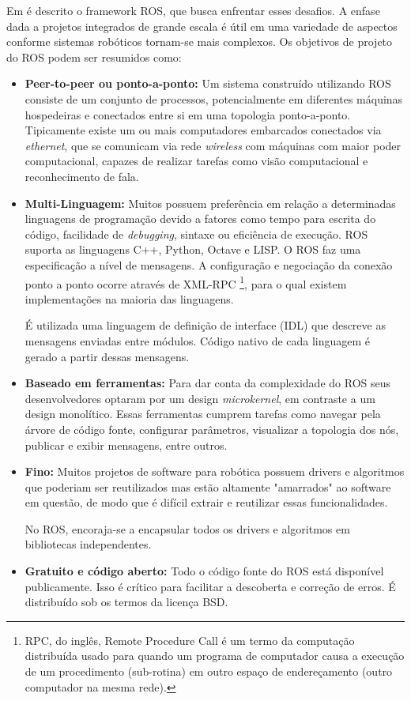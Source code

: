 Em \citep{quigley2009ros} é descrito o framework ROS, que busca enfrentar esses desafios. A enfase dada a projetos integrados de grande escala é útil em uma variedade de aspectos conforme sistemas robóticos tornam-se mais complexos. Os objetivos de projeto do ROS podem ser resumidos como: 
\begin{itemize}
\item \textbf{Peer-to-peer ou ponto-a-ponto:} Um sistema construído utilizando ROS consiste de um conjunto de processos, potencialmente em diferentes máquinas hospedeiras e conectados entre si em uma topologia ponto-a-ponto. Tipicamente existe um ou mais computadores embarcados conectados via \textit{ethernet}, que se comunicam via rede \textit{wireless} com máquinas com maior poder computacional, capazes de realizar tarefas como visão computacional e reconhecimento de fala. 

\item \textbf{Multi-Linguagem:} Muitos possuem preferência em relação a determinadas linguagens de programação devido a fatores como tempo para escrita do código, facilidade de \textit{debugging}, sintaxe ou eficiência de execução. ROS suporta as linguagens C++, Python, Octave e LISP. O ROS faz uma especificação a nível de mensagens. A configuração e negociação da conexão ponto a ponto ocorre através de XML-RPC \footnote{RPC, do inglês, Remote Procedure Call é um termo da computação distribuída usado para quando um programa de computador causa a execução de um procedimento (sub-rotina) em outro espaço de endereçamento (outro computador na mesma rede).}, para o qual existem implementações na maioria das linguagens.   

É utilizada uma linguagem de definição de interface (IDL) que descreve as mensagens enviadas entre módulos. Código nativo de cada linguagem é gerado a partir dessas mensagens. 


\item \textbf{Baseado em ferramentas:} Para dar conta da complexidade do ROS seus desenvolvedores optaram por um design \textit{microkernel}, em contraste a um design monolítico. Essas ferramentas cumprem tarefas como navegar pela árvore de código fonte, configurar parâmetros, visualizar a topologia dos nós, publicar e exibir mensagens, entre outros.

\item \textbf{Fino:} Muitos projetos de software para robótica possuem drivers e algoritmos que poderiam ser reutilizados mas estão altamente "amarrados" ao software em questão, de modo que é difícil extrair e reutilizar essas funcionalidades.

No ROS, encoraja-se a encapsular todos os drivers e algoritmos em bibliotecas independentes. 


\item \textbf{Gratuito e código aberto:} Todo o código fonte do ROS está disponível publicamente. Isso é crítico para facilitar a descoberta e correção de erros. É distribuído sob os termos da licença BSD.  

\end{itemize}

